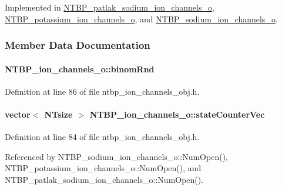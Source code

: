 Implemented in \hyperlink{class_n_t_b_p__patlak__sodium__ion__channels__o_ad3ab2a983cdc7acb49acc91f217d1527}{NTBP\_\-patlak\_\-sodium\_\-ion\_\-channels\_\-o}, \hyperlink{class_n_t_b_p__potassium__ion__channels__o_af000db84e4f01e8f0e5af8f104711076}{NTBP\_\-potassium\_\-ion\_\-channels\_\-o}, and \hyperlink{class_n_t_b_p__sodium__ion__channels__o_a9eb9ea77b08b7a09650dc7409fca112d}{NTBP\_\-sodium\_\-ion\_\-channels\_\-o}.



\subsubsection{Member Data Documentation}
\paragraph[{binomRnd}]{ {\bf NTBP\_\-ion\_\-channels\_\-o::binomRnd}}\hfill\label{class_n_t_b_p__ion__channels__o_a624ace6b6ed786eae71b2833c4d8e7a4}


Definition at line 86 of file ntbp\_\-ion\_\-channels\_\-obj.h.

\paragraph[{stateCounterVec}]{\setlength{\rightskip}{0pt plus 5cm}vector$<$ {\bf NTsize} $>$ {\bf NTBP\_\-ion\_\-channels\_\-o::stateCounterVec}}\hfill\label{class_n_t_b_p__ion__channels__o_a2a06cae230e79c0548210d704fdab042}


Definition at line 84 of file ntbp\_\-ion\_\-channels\_\-obj.h.



Referenced by NTBP\_\-sodium\_\-ion\_\-channels\_\-o::NumOpen(), NTBP\_\-potassium\_\-ion\_\-channels\_\-o::NumOpen(), and NTBP\_\-patlak\_\-sodium\_\-ion\_\-channels\_\-o::NumOpen().

